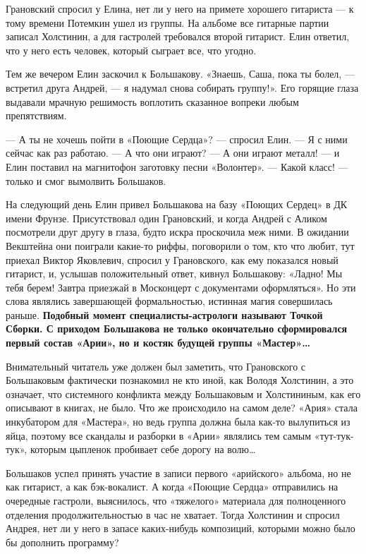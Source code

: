 \documentclass[10pt, twoside]{book}
\begin{document}
Грановский спросил у Елина, нет ли у него на примете хорошего гитариста — к тому времени Потемкин ушел из группы. На
альбоме все гитарные партии записал Холстинин, а для гастролей требовался второй гитарист. Елин ответил, что у него есть
человек, который сыграет все, что угодно.

Тем же вечером Елин заскочил к Большакову. «Знаешь, Саша, пока ты болел, — встретил друга Андрей, — я надумал снова
собирать группу!». Его горящие глаза выдавали мрачную решимость воплотить сказанное вопреки любым препятствиям.

— А ты не хочешь пойти в «Поющие Сердца»? — спросил Елин. — Я с ними сейчас как раз работаю.
— А что они играют?
— А они играют металл! — и Елин поставил на магнитофон заготовку песни «Волонтер».
— Какой класс! — только и смог вымолвить Большаков.

На следующий день Елин привел Большакова на базу «Поющих Сердец» в ДК имени Фрунзе. Присутствовал один Грановский, и
когда Андрей с Аликом посмотрели друг другу в глаза, будто искра проскочила меж ними. В ожидании Векштейна они поиграли
какие-то риффы, поговорили о том, кто что любит, тут приехал Виктор Яковлевич, спросил у Грановского, как ему показался
новый гитарист, и, услышав положительный ответ, кивнул Большакову: «Ладно! Мы тебя берем! Завтра приезжай в Москонцерт с
документами оформляться». Но эти слова являлись завершающей формальностью, истинная магия совершилась раньше.
\textbf{Подобный момент специалисты-астрологи называют Точкой Сборки. С приходом Большакова не только окончательно
сформировался первый состав «Арии», но и костяк будущей группы «Мастер»\ldots}

Внимательный читатель уже должен был заметить, что Грановского с Большаковым фактически познакомил не кто иной, как
Володя Холстинин, а это означает, что системного конфликта между Большаковым и Холстининым, как его описывают в книгах,
не было. Что же происходило на самом деле? «Ария» стала инкубатором для «Мастера», но ведь группа должна была как-то
вылупиться из яйца, поэтому все скандалы и разборки в «Арии» являлись тем самым «тут-тук-тук», которым цыпленок
пробивает себе дорогу на волю\ldots

Большаков успел принять участие в записи первого «арийского» альбома, но не как гитарист, а как бэк-вокалист. А когда
«Поющие Сердца» отправились на очередные гастроли, выяснилось, что «тяжелого» материала для полноценного отделения
продолжительностью в час не хватает. Тогда Холстинин и спросил Андрея, нет ли у него в запасе каких-нибудь композиций,
которыми можно было бы дополнить программу?
\end{document}
